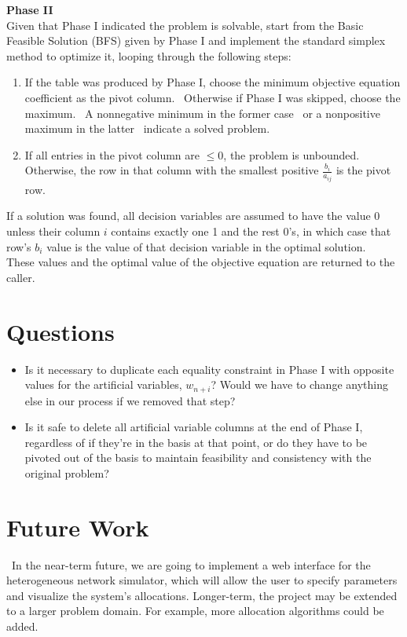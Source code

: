 \documentclass[11pt]{article}
\begin{document}
\noindent \textbf{Phase II}\\
Given that Phase I indicated the problem is solvable, start from the Basic Feasible Solution (BFS) given by Phase I and implement the standard simplex method to optimize it, looping through the following steps:
\begin{enumerate}
\item If the table was produced by Phase I, choose the minimum objective equation coefficient as the pivot column.~\cite{chvatal83} Otherwise if Phase I was skipped, choose the maximum.~\cite{wolfram} A nonnegative minimum in the former case~\cite{chvatal83} or a nonpositive maximum in the latter~\cite{wolfram} indicate a solved problem.
\item If all entries in the pivot column are $\leq 0$, the problem is unbounded.~\cite{chvatal83} Otherwise, the row in that column with the smallest positive $\frac{b_i}{a_{ij}}$ is the pivot row.~\cite{chvatal83}
\end{enumerate}
If a solution was found, all decision variables are assumed to have the value 0 unless their column $i$ contains exactly one 1 and the rest 0's, in which case that row's $b_i$ value is the value of that decision variable in the optimal solution.~\cite{chvatal83} These values and the optimal value of the objective equation are returned to the caller.

\section{Questions}

\begin{itemize}
\item Is it necessary to duplicate each equality constraint in Phase I with opposite values for the artificial variables, $w_{n+i}$? Would we have to change anything else in our process if we removed that step?
\item Is it safe to delete all artificial variable columns at the end of Phase I, regardless of if they're in the basis at that point, or do they have to be pivoted out of the basis to maintain feasibility and consistency with the original problem?
\end{itemize}

\section{Future Work}

~\indent In the near-term future, we are going to implement a web interface for the heterogeneous network simulator, which will allow the user to specify parameters and visualize the system's allocations. Longer-term, the project may be extended to a larger problem domain. For example, more allocation algorithms could be added.
\end{document}
